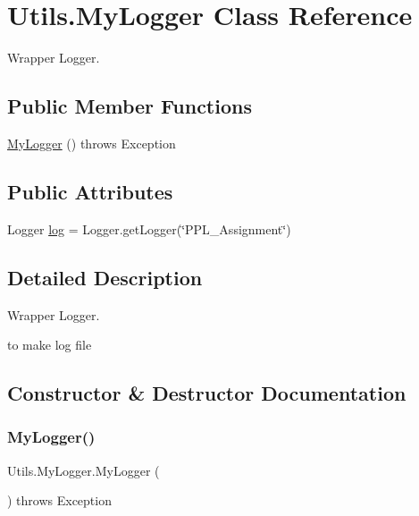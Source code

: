 \hypertarget{class_utils_1_1_my_logger}{}\section{Utils.\+My\+Logger Class Reference}
\label{class_utils_1_1_my_logger}


Wrapper Logger.  


\subsection*{Public Member Functions}
\begin{DoxyCompactItemize}
\item 
\hyperlink{class_utils_1_1_my_logger_ac4e5f9c2ec0c0ca9a91caf3b73808b3a}{My\+Logger} ()  throws Exception
\end{DoxyCompactItemize}
\subsection*{Public Attributes}
\begin{DoxyCompactItemize}
\item 
Logger \hyperlink{class_utils_1_1_my_logger_a1cfaca3077446ea78a1055d8b1154b0c}{log} = Logger.\+get\+Logger(\char`\"{}P\+P\+L\+\_\+\+Assignment\char`\"{})
\end{DoxyCompactItemize}


\subsection{Detailed Description}
Wrapper Logger. 

to make log file 

\subsection{Constructor \& Destructor Documentation}
\mbox{\label{class_utils_1_1_my_logger_ac4e5f9c2ec0c0ca9a91caf3b73808b3a}} 
\subsubsection{\texorpdfstring{My\+Logger()}{MyLogger()}}
{\footnotesize\ttfamily Utils.\+My\+Logger.\+My\+Logger (\begin{DoxyParamCaption}{ }\end{DoxyParamCaption}) throws Exception\hspace{0.3cm}{\ttfamily [inline]}}

